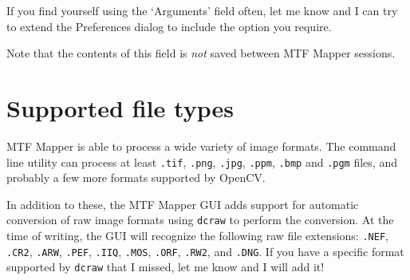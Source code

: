 \documentclass[a4paper]{article}
\begin{document}
\begin{description}
If you find yourself using the `Arguments' field often, let me know and I
can try to extend the \textsf{Preferences} dialog to include the option you
require.

Note that the contents of this field is \emph{not} saved between MTF Mapper
sessions.

\end{description}

\newpage

\section{Supported file types}
MTF Mapper is able to process a wide variety of image formats. The command
line utility can process at least \texttt{.tif}, \texttt{.png}, \texttt{.jpg},
\texttt{.ppm}, \texttt{.bmp} and \texttt{.pgm} files, and probably a few more formats
supported by OpenCV.

In addition to these, the MTF Mapper GUI adds support for automatic conversion of raw image
formats using \texttt{dcraw} to perform the conversion. At the time of
writing, the GUI will recognize the following raw file extensions:
\texttt{.NEF}, \texttt{.CR2}, \texttt{.ARW}, \texttt{.PEF}, \texttt{.IIQ},
\texttt{.MOS}, \texttt{.ORF}, \texttt{.RW2}, and \texttt{.DNG}. If you have
a specific format supported by \texttt{dcraw} that I missed, let me know and
I will add it!
\end{document}
